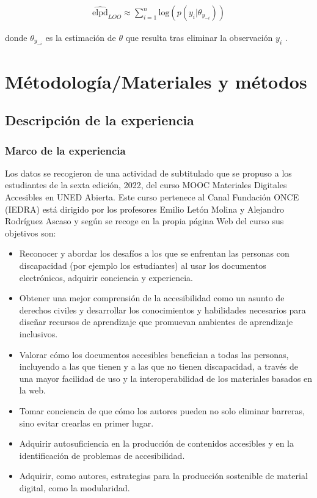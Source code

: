 \documentclass[
  12pt,
  a4paper,
  extrafontsizes,
  onecolumn,
  openright,
  table]{memoir}
\begin{document}
\[
\begin{aligned}
\widehat{\mathrm{elpd}}_{LOO} \approx \sum_{i=1}^{n} \mathrm{log} (p(y_{i} | \theta_{y_{-i}}))
\end{aligned}
\]

donde \(\theta_{y_{-i}}\) es la estimación de \(\theta\) que resulta
tras eliminar la observación \(y_{i}\) \autocite[ver][
pp.~175-176]{gelman2013}.


\hypertarget{sec-metodo}{%
\chapter{Métodología/Materiales y métodos}\label{sec-metodo}}

\hypertarget{descripciuxf3n-de-la-experiencia}{%
\section{Descripción de la
experiencia}\label{descripciuxf3n-de-la-experiencia}}

\hypertarget{marco-de-la-experiencia}{%
\subsection{Marco de la experiencia}\label{marco-de-la-experiencia}}

Los datos se recogieron de una actividad de subtitulado que se propuso a
los estudiantes de la sexta edición, 2022, del curso MOOC Materiales
Digitales Accesibles en UNED Abierta. Este curso pertenece al Canal
Fundación ONCE (IEDRA) está dirigido por los profesores Emilio Letón
Molina y Alejandro Rodríguez Ascaso y según se recoge en la propia
página Web del curso sus objetivos son:

\begin{itemize}
\item
  Reconocer y abordar los desafíos a los que se enfrentan las personas
  con discapacidad (por ejemplo los estudiantes) al usar los documentos
  electrónicos, adquirir conciencia y experiencia.
\item
  Obtener una mejor comprensión de la accesibilidad como un asunto de
  derechos civiles y desarrollar los conocimientos y habilidades
  necesarios para diseñar recursos de aprendizaje que promuevan
  ambientes de aprendizaje inclusivos.
\item
  Valorar cómo los documentos accesibles benefician a todas las
  personas, incluyendo a las que tienen y a las que no tienen
  discapacidad, a través de una mayor facilidad de uso y la
  interoperabilidad de los materiales basados en la web.
\item
  Tomar conciencia de que cómo los autores pueden no solo eliminar
  barreras, sino evitar crearlas en primer lugar.
\item
  Adquirir autosuficiencia en la producción de contenidos accesibles y
  en la identificación de problemas de accesibilidad.
\item
  Adquirir, como autores, estrategias para la producción sostenible de
  material digital, como la modularidad.
\end{itemize}
\end{document}
